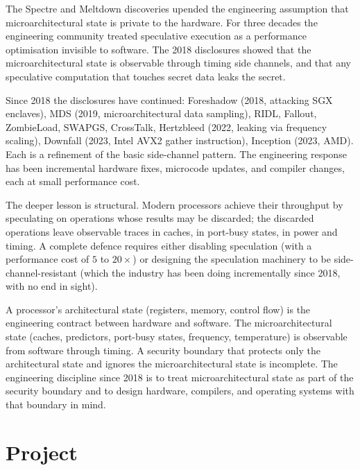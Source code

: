 The Spectre and Meltdown discoveries upended the engineering assumption that microarchitectural state is private to the hardware. For three decades the engineering community treated speculative execution as a performance optimisation invisible to software. The 2018 disclosures showed that the microarchitectural state is observable through timing side channels, and that any speculative computation that touches secret data leaks the secret.

Since 2018 the disclosures have continued: Foreshadow (2018, attacking SGX enclaves), MDS (2019, microarchitectural data sampling), RIDL, Fallout, ZombieLoad, SWAPGS, CrossTalk, Hertzbleed (2022, leaking via frequency scaling), Downfall (2023, Intel AVX2 gather instruction), Inception (2023, AMD). Each is a refinement of the basic side-channel pattern. The engineering response has been incremental hardware fixes, microcode updates, and compiler changes, each at small performance cost.

The deeper lesson is structural. Modern processors achieve their throughput by speculating on operations whose results may be discarded; the discarded operations leave observable traces in caches, in port-busy states, in power and timing. A complete defence requires either disabling speculation (with a performance cost of $5$ to $20\times$) or designing the speculation machinery to be side-channel-resistant (which the industry has been doing incrementally since 2018, with no end in sight).

\begin{principle}
A processor's architectural state (registers, memory, control flow) is the engineering contract between hardware and software. The microarchitectural state (caches, predictors, port-busy states, frequency, temperature) is observable from software through timing. A security boundary that protects only the architectural state and ignores the microarchitectural state is incomplete. The engineering discipline since 2018 is to treat microarchitectural state as part of the security boundary and to design hardware, compilers, and operating systems with that boundary in mind.
\end{principle}

\section{Project}

